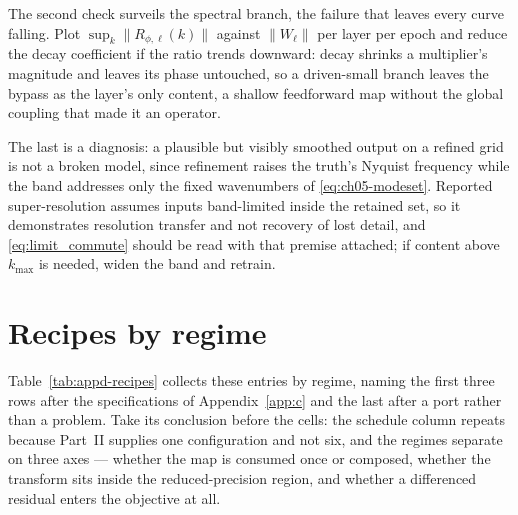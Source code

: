 The second check surveils the spectral branch, the failure that leaves every curve
falling. Plot $\sup_k \lVert R_{\phi,\ell}(k)\rVert$ against $\lVert W_\ell\rVert$
per layer per epoch and reduce the decay coefficient if the ratio trends downward:
decay shrinks a multiplier's magnitude and leaves its phase untouched, so a
driven-small branch leaves the bypass as the layer's only content, a shallow
feedforward map without the global coupling that made it an operator.

The last is a diagnosis: a plausible but visibly smoothed output on a refined grid
is not a broken model, since refinement raises the truth's Nyquist frequency while
the band addresses only the fixed wavenumbers of \eqref{eq:ch05-modeset}. Reported
super-resolution assumes inputs band-limited inside the retained set, so it demonstrates resolution transfer and not
recovery of lost detail, and \eqref{eq:limit_commute} should be read with that premise
attached; if content above $k_{\max}$ is needed, widen the band and retrain.

\section{Recipes by regime}
\label{sec:appd-table}

Table~\ref{tab:appd-recipes} collects these entries by regime, naming the first
three rows after the specifications of Appendix~\ref{app:c} and the last after a
port rather than a problem. Take its conclusion before the cells: the
schedule column repeats because Part~II supplies one configuration and not six, and
the regimes separate on three axes --- whether the map is consumed once or composed,
whether the transform sits inside the reduced-precision region, and whether a
differenced residual enters the objective at all.

